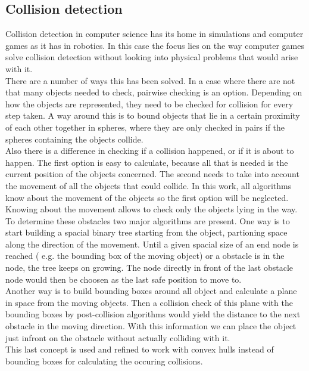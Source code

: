 \subsection{Collision detection}
Collision detection in computer science has its home in simulations and computer games as it has in robotics. In this case the focus lies on the way computer games solve collision detection without looking into physical problems that would arise with it.\\
There are a number of ways this has been solved. In a case where there are not that many objects needed to check, pairwise checking is an option. Depending on how the objects are represented, they need to be checked for collision for every step taken. A way around this is to bound objects that lie in a certain proximity of each other together in spheres, where they are only checked in pairs if the spheres containing the objects collide.\\
Also there is a difference in checking if a collision happened, or if it is about to happen. The first option is easy to calculate, because all that is needed is the current position of the objects concerned. The second needs to take into account the movement of all the objects that could collide. In this work, all algorithms know about the movement of the objects so the first option will be neglected.\\
Knowing about the movement allows to check only the objects lying in the way. To determine these obstacles two major algorithms are present.
One way is to start building a spacial binary tree starting from the object, partioning space along the direction of the movement. Until a given spacial size of an end node is reached ( e.g. the bounding box of the moving object) or a obstacle is in the node, the tree keeps on growing. The node directly in front of the last obstacle node would then be choosen as the last safe position to move to.\\
Another way is to build bounding boxes around all object and calculate a plane in space from the moving objects. Then a collision check of this plane with the bounding boxes by post-collision algorithms would yield the distance to the next obstacle in the moving direction. With this information we can place the object just infront on the obstacle without actually colliding with it.\\
This last concept is used and refined to work with convex hulls instead of bounding boxes for calculating the occuring collisions.


